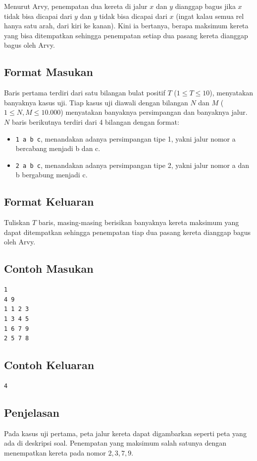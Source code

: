 \documentclass{article}
\begin{document}
Menurut Arvy, penempatan dua kereta di jalur $x$ dan $y$ dianggap bagus jika $x$ tidak bisa dicapai dari $y$ dan $y$ tidak bisa dicapai dari $x$ (ingat kalau semua rel hanya satu arah, dari kiri ke kanan).
Kini ia bertanya, berapa maksimum kereta yang bisa ditempatkan sehingga penempatan setiap dua pasang kereta dianggap bagus oleh Arvy.

\subsection*{Format Masukan}
Baris pertama terdiri dari satu bilangan bulat positif $T$ ($1 \leq T \leq 10$), menyatakan banyaknya kasus uji.
Tiap kasus uji diawali dengan bilangan $N$ dan $M$ ($1 \leq N, M \leq 10.000$) menyatakan banyaknya persimpangan dan banyaknya jalur.
$N$ baris berikutnya terdiri dari 4 bilangan dengan format:
\begin{itemize}
    \setlength{\itemsep}{0pt}
    \item \lstinline{1 a b c}, menandakan adanya persimpangan tipe 1, yakni jalur nomor a bercabang menjadi b dan c.
    \item \lstinline{2 a b c}, menandakan adanya persimpangan tipe 2, yakni jalur nomor a dan b bergabung menjadi c.
\end{itemize}

\subsection*{Format Keluaran}
Tuliskan $T$ baris, masing-masing berisikan banyaknya kereta maksimum yang dapat ditempatkan sehingga penempatan tiap dua pasang kereta dianggap bagus oleh Arvy.

\pagebreak

\begin{multicols}{2}
\subsection*{Contoh Masukan}
\begin{lstlisting}
1
4 9
1 1 2 3
1 3 4 5
1 6 7 9
2 5 7 8
\end{lstlisting}
\columnbreak
\subsection*{Contoh Keluaran}
\begin{lstlisting}
4
\end{lstlisting}
\vfill
\null
\end{multicols}

\subsection*{Penjelasan}
Pada kasus uji pertama, peta jalur kereta dapat digambarkan seperti peta yang ada di deskripsi soal. Penempatan yang maksimum salah satunya dengan menempatkan kereta pada nomor $2, 3, 7, 9$.
\end{document}
